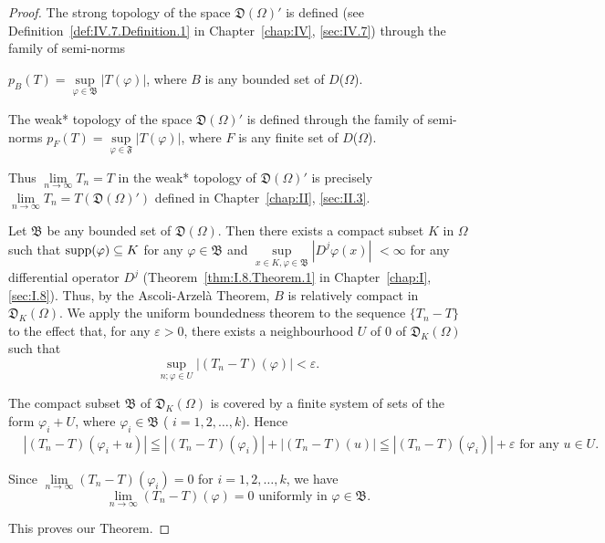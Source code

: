 \begin{proof}
 The strong topology of the space $\mathfrak{D}(\Omega)'$ is defined (see Definition~\ref{def:IV.7.Definition.1} in Chapter~\ref{chap:IV}, \ref{sec:IV.7}) through the family of semi-norms 

$p_{B}(T)=\sup\limits_{\varphi\in\mathfrak{B}}|T(\varphi)|$, where $B$ is any bounded set of $D$($\Omega$). 


The weak* topology of the space $\mathfrak{D}(\Omega)'$ is defined through the family of semi-norms 
$p_{F}(T)=\sup\limits_{\varphi\in\mathfrak{F}}|T(\varphi)|$, where $F$ is any finite set of $D$($\Omega$). 

Thus $\lim\limits_{n\to \infty}T_n = T$ in the weak* topology of $\mathfrak{D}(\Omega)'$ is precisely $\lim\limits_{n\to \infty}T_n = T(\mathfrak{D}(\Omega)')$ defined in Chapter~\ref{chap:II}, \ref{sec:II.3}. 

Let $\mathfrak{B}$ be any bounded set of $\mathfrak{D}(\Omega)$. Then there exists a compact subset $K$ in $\Omega$ such that $\operatorname{supp}(\varphi) \subseteq K$ for any $\varphi \in \mathfrak{B}$ and $\sup\limits_{x \in K, \varphi \in \mathfrak{B}} |D^j\varphi(x)|$ 
$<\infty$ for any differential operator $D^{j}$ (Theorem~\ref{thm:I.8.Theorem.1} in Chapter~\ref{chap:I}, \ref{sec:I.8}). Thus, by the Ascoli-Arzelà Theorem, $B$ is relatively compact in $\mathfrak{D}_{K}(\Omega)$. We apply the uniform boundedness theorem to the sequence $\{T_{n}-T\}$ to the effect that, for any $\varepsilon>0$, there exists a neighbourhood $U$ of $0$ of $\mathfrak{D}_{K}(\Omega)$ such that 
\[
\sup\limits _{n; \varphi \in U} | (T _{n} - T) (\varphi) | < \varepsilon .
\]

The compact subset $\mathfrak{B}$ of $\mathfrak{D}_K(\Omega)$ is covered by a finite system of sets of the form $\varphi_i + U$, where $\varphi_i \in \mathfrak{B}$ ( $i = 1, 2, \ldots, k$). Hence 
\[
\begin{aligned}
&\left| (T _{n} - T) (\varphi_{i} + u) \right|  \leqq \left| (T _{n} - T) (\varphi_{i}) \right| + \left| (T _{n} - T) (u) \right| \leqq \left| (T _{n} - T) (\varphi_{i}) \right| + \varepsilon \text{ for any } u \in U.
\end{aligned}
\]

Since $\lim\limits_{n\to \infty}(T_n - T)(\varphi_i) = 0$ for $i = 1,2,\ldots ,k$, we have 
\[
\lim\limits _{n \rightarrow \infty} (T _{n} - T) (\varphi) = 0 \text{ uniformly in } \varphi \in \mathfrak {B}.
\]

This proves our Theorem.
\end{proof}

